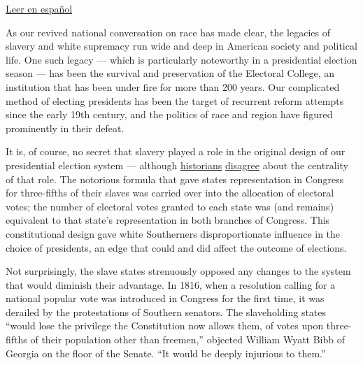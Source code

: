 \href{https://www.nytimes3xbfgragh.onion/es/2020/08/03/espanol/opinion/colegio-electoral-estados-unidos.html}{Leer
en español}

As our revived national conversation on race has made clear, the
legacies of slavery and white supremacy run wide and deep in American
society and political life. One such legacy --- which is particularly
noteworthy in a presidential election season --- has been the survival
and preservation of the Electoral College, an institution that has been
under fire for more than 200 years. Our complicated method of electing
presidents has been the target of recurrent reform attempts since the
early 19th century, and the politics of race and region have figured
prominently in their defeat.

It is, of course, no secret that slavery played a role in the original
design of our presidential election system --- although
\href{https://www.nytimes3xbfgragh.onion/2019/04/04/opinion/the-electoral-college-slavery-myth.html?action=click\&module=RelatedLinks\&pgtype=Article}{historians}
\href{https://www.nytimes3xbfgragh.onion/2019/04/06/opinion/electoral-college-slavery.html}{disagree}
about the centrality of that role. The notorious formula that gave
states representation in Congress for three-fifths of their slaves was
carried over into the allocation of electoral votes; the number of
electoral votes granted to each state was (and remains) equivalent to
that state's representation in both branches of Congress. This
constitutional design gave white Southerners disproportionate influence
in the choice of presidents, an edge that could and did affect the
outcome of elections.

Not surprisingly, the slave states strenuously opposed any changes to
the system that would diminish their advantage. In 1816, when a
resolution calling for a national popular vote was introduced in
Congress for the first time, it was derailed by the protestations of
Southern senators. The slaveholding states ``would lose the privilege
the Constitution now allows them, of votes upon three-fifths of their
population other than freemen,'' objected William Wyatt Bibb of Georgia
on the floor of the Senate. ``It would be deeply injurious to them.''

